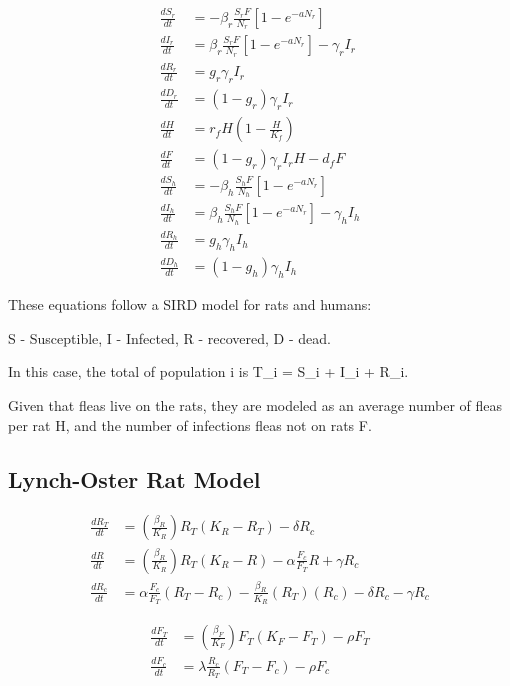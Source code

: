 \documentclass [letterpaper, 12pt] {article}
\begin{document}
\begin{equation}
	\begin{align*}
		\frac{dS_r}{dt} &= - \beta_r \frac{S_r F}{N_r} \left[ 1 - e^{-aN_r} \right] \\
		\frac{dI_r}{dt} &= \beta_r \frac{S_r F}{N_r} \left[ 1 - e^{-aN_r} \right] - \gamma_r I_r \\
		\frac{dR_r}{dt} &= g_r \gamma_r I_r \\
		\frac{dD_r}{dt} &= (1 - g_r) \gamma_r I_r \\
		\frac{dH}{dt} &= r_f H \left( 1 - \frac{H}{K_f} \right) \\
		\frac{dF}{dt} &= (1 - g_r) \gamma_r I_r H - d_f F \\
		\frac{dS_h}{dt} &= - \beta_h \frac{S_h F}{N_h} \left[ 1 - e^{-aN_r} \right] \\
		\frac{dI_h}{dt} &= \beta_h \frac{S_h F}{N_h} \left[ 1 - e^{-aN_r} \right] - \gamma_h I_h \\
		\frac{dR_h}{dt} &= g_h \gamma_h I_h \\
		\frac{dD_h}{dt} &= (1 - g_h) \gamma_h I_h
	\end{align*}
\end{equation}

These equations follow a SIRD model for rats and humans:

S - Susceptible,
I - Infected,
R - recovered,
D - dead.

In this case, the total of population i is T_i = S_i + I_i + R_i.

Given that fleas live on the rats, they are modeled as an average number of fleas per rat H, and the number of infections fleas not on rats F.

\subsection{Lynch-Oster Rat Model}

\begin{align}
	\frac{dR_T}{dt} &= (\frac{\beta_R}{K_R})R_T(K_R-R_T)-\delta R_c \\
	\frac{dR}{dt} &= (\frac{\beta_R}{K_R})R_T(K_R-R)-\alpha \frac{F_c}{F_T}R+\gamma  R_c \\
	\frac{dR_c}{dt} &= \alpha \frac{F_c}{F_T} (R_T-R_c)-\frac{\beta_R}{K_R}(R_T)(R_c) - \delta R_c - \gamma R_c 
\end{align}


\begin{align}
	\frac{dF_T}{dt} &= (\frac{\beta_F}{K_F})F_T(K_F-F_T)-\rho F_T  \\
	\frac{dF_c}{dt} &= \lambda \frac{R_c}{R_T} (F_T-F_c) - \rho F_c 
\end{align}
\end{document}
